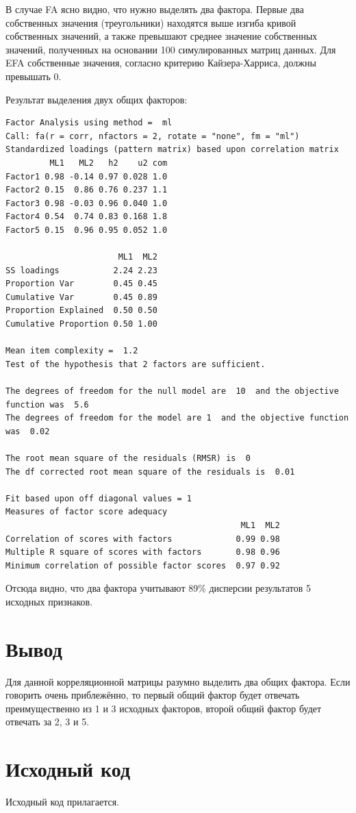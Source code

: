 \documentclass{article} %
\begin{document}
В случае FA ясно видно, что нужно выделять два фактора.
Первые два собственных значения (треугольники) находятся выше изгиба
кривой собственных значений, а также превышают среднее значение
собственных значений, полученных на основании 100 симулированных матриц данных.
Для EFA собственные значения, согласно критерию Кайзера-Харриса, должны превышать 0.

Результат выделения двух общих факторов:

\begin{lstlisting}
Factor Analysis using method =  ml
Call: fa(r = corr, nfactors = 2, rotate = "none", fm = "ml")
Standardized loadings (pattern matrix) based upon correlation matrix
         ML1   ML2   h2    u2 com
Factor1 0.98 -0.14 0.97 0.028 1.0
Factor2 0.15  0.86 0.76 0.237 1.1
Factor3 0.98 -0.03 0.96 0.040 1.0
Factor4 0.54  0.74 0.83 0.168 1.8
Factor5 0.15  0.96 0.95 0.052 1.0

                       ML1  ML2
SS loadings           2.24 2.23
Proportion Var        0.45 0.45
Cumulative Var        0.45 0.89
Proportion Explained  0.50 0.50
Cumulative Proportion 0.50 1.00

Mean item complexity =  1.2
Test of the hypothesis that 2 factors are sufficient.

The degrees of freedom for the null model are  10  and the objective function was  5.6
The degrees of freedom for the model are 1  and the objective function was  0.02 

The root mean square of the residuals (RMSR) is  0 
The df corrected root mean square of the residuals is  0.01 

Fit based upon off diagonal values = 1
Measures of factor score adequacy             
                                                ML1  ML2
Correlation of scores with factors             0.99 0.98
Multiple R square of scores with factors       0.98 0.96
Minimum correlation of possible factor scores  0.97 0.92
\end{lstlisting}

Отсюда видно, что два фактора учитывают 89\%
дисперсии результатов 5 исходных признаков.

\section*{Вывод}
Для данной корреляционной матрицы разумно выделить два общих фактора.
Если говорить очень приблежённо,
то первый общий фактор будет отвечать
преимущественно из 1 и 3 исходных факторов,
второй общий фактор будет отвечать за 2, 3 и 5.

\section*{Исходный код}
Исходный код прилагается.
\end{document}
